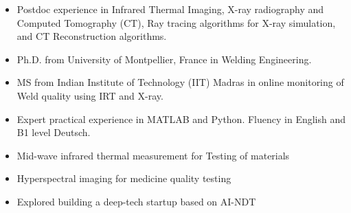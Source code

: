 \documentclass[10pt,a4paper]{altacv}
\begin{document}

\begin{fullwidth}
\makecvheader
\end{fullwidth}


\begin{itemize}[leftmargin=0.15in]
\item Postdoc experience in Infrared Thermal Imaging, X-ray radiography and Computed Tomography (CT), Ray tracing algorithms for X-ray simulation, and CT Reconstruction algorithms.
\item Ph.D. from University of Montpellier, France in Welding Engineering.
\item MS from Indian Institute of Technology (IIT) Madras in online monitoring of Weld quality using IRT and X-ray.
\item Expert practical experience in MATLAB and Python. Fluency in English and B1 level Deutsch.
\end{itemize}



\begin{itemize}
\item Mid-wave infrared thermal measurement for Testing of materials
\item Hyperspectral imaging for medicine quality testing 
\end{itemize}

\divider

\begin{itemize}
\item Explored building a deep-tech startup based on AI-NDT 
\end{itemize}
\end{document}
